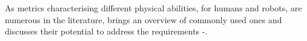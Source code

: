 As metrics characterising different physical abilities, for humans and robots, are numerous in the literature,  brings an overview of commonly used ones and discusses their potential to address the requirements -.







